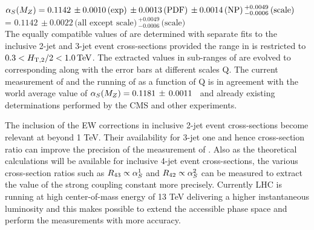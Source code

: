 $\alpha_S(M_Z) = 0.1142\,\pm0.0010\,\textrm{(exp)}\,\pm0.0013\,\textrm{(PDF)}\,\pm0.0014\,\textrm{(NP)}\,^{+0.0049}_{-0.0006}\,\textrm{(scale)}$ \\ \hspace*{24mm} = $0.1142\,\pm0.0022\,\textrm{(all except scale)}\,^{+0.0049}_{-0.0006}\,\textrm{(scale)}$\\ 
The equally compatible values of \alpsmz are determined with separate fits to the inclusive 2-jet and 3-jet event cross-sections provided the range in \httwo is restricted to $0.3 < H_{\mathrm{T,2}}/2 < 1.0\,\text{Te\hspace{-.08em}V}$. The extracted \alpsmz values in sub-ranges of \httwo are evolved to corresponding \alpsq along with the error bars at different scales Q. The current measurement of \alpsmz and the running of \alpsq as a function of Q is in agreement with the world average value of $\alpha_S(M_Z) = 0.1181 \,\pm\, 0.0011$~\cite{Patrignani:2016xqp} and already existing determinations performed by the CMS and other experiments.

The inclusion of the EW corrections in inclusive 2-jet event cross-sections become relevant at \httwo beyond 1 TeV. Their availability for 3-jet one and hence cross-section ratio \ratio can improve the precision of the measurement of \alpsmz. Also as the theoretical calculations will be available for inclusive 4-jet event cross-sections, the various cross-section ratios such as $R_{\rm 43} \propto \alpha_S^1$ and $R_{\rm 42} \propto \alpha_S^2$ can be measured to extract the value of the strong coupling constant more precisely. Currently LHC is running at high center-of-mass energy of 13 TeV delivering a higher instantaneous luminosity and this makes possible to extend the accessible phase space and perform the measurements with more accuracy.
